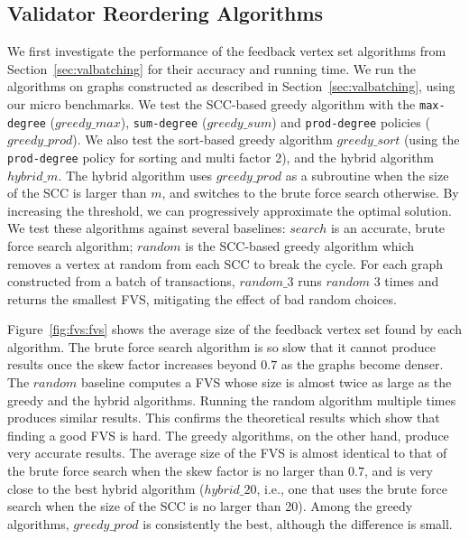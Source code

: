 \subsection{Validator Reordering Algorithms}
We first investigate the performance of the feedback vertex set algorithms from Section~\ref{sec:valbatching} 
for their accuracy and running time. We run the algorithms on graphs constructed as described in Section~\ref{sec:valbatching}, using our micro benchmarks. 
We test the SCC-based greedy algorithm with the \texttt{max-degree} ($greedy\_max$), \texttt{sum-degree} ($greedy\_sum$) and \texttt{prod-degree} policies ($greedy\_prod$). We also test the sort-based greedy algorithm $greedy\_sort$ (using the \texttt{prod-degree} policy for sorting and multi factor 2), and the hybrid algorithm $hybrid\_m$. The hybrid algorithm uses $greedy\_prod$ as a subroutine when the size of the SCC is larger than $m$, and switches to the brute force search otherwise. By increasing the threshold, we can progressively approximate the optimal solution. 
We test these algorithms against several baselines: $search$ is an accurate,
brute force search algorithm; $random$ is the SCC-based greedy algorithm which
removes a vertex at random from each SCC to break the cycle. For each graph constructed from a batch of transactions,
$random\_3$ runs $random$ 3 times and returns the smallest FVS, mitigating the
effect of bad random choices.

Figure~\ref{fig:fvs:fvs} shows the average size of the feedback vertex set found by each algorithm. The brute force search algorithm is so slow that it cannot produce results once the skew factor increases beyond $0.7$ as the graphs become denser.
The $random$ baseline computes a FVS whose size is almost twice as large as the greedy and the hybrid algorithms. Running the random algorithm multiple times produces similar results. This confirms the theoretical results which show that finding a good FVS is hard. The greedy algorithms, on the other hand, produce very accurate results. The average size of the FVS is almost identical to that of the brute force search when the skew factor is no larger than $0.7$, and is very close to the best hybrid algorithm ($hybrid\_20$, i.e., one that uses the brute force search when the size of the SCC is no larger than 20). Among the greedy algorithms, $greedy\_prod$ is consistently the best, although the difference is small.

